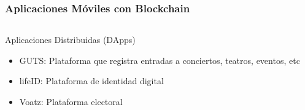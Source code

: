 \documentclass[usenames,dvipsnames]{beamer}
\begin{document}
\begin{frame} 
\frametitle{Aplicaciones Móviles con Blockchain} 
  \begin{columns}
  \begin{column}{0.6\textwidth}
    \center \textcolor{UniGold}{Aplicaciones Distribuidas (DApps)}
    \begin{itemize}
      \item \textcolor{UniGold}{\small GUTS:} Plataforma que registra entradas a conciertos, teatros, eventos, etc
      \item \textcolor{UniGold}{lifeID:} Plataforma de identidad digital
      \item \textcolor{UniGold}{Voatz:} Plataforma electoral
    \end{itemize}
  \end{column}
  \begin{column}{0.4\textwidth}
  \end{column}
  \end{columns}
\end{frame}
\end{document}
